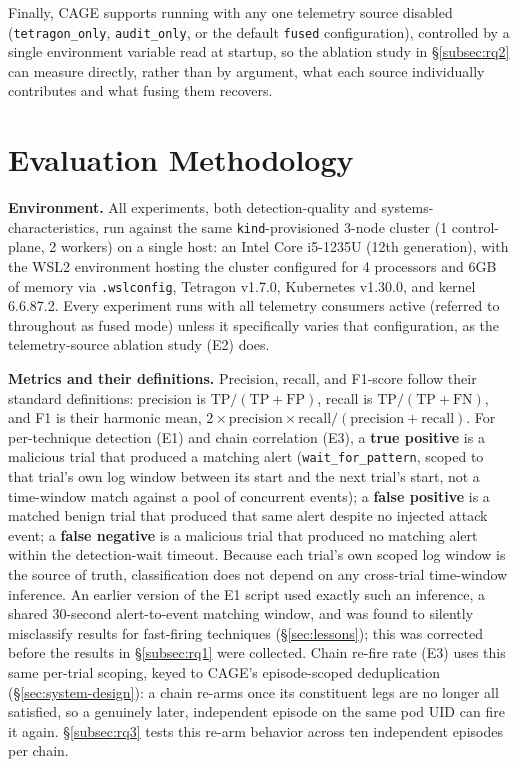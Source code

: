 \documentclass{ieeeaccess}
\begin{document}
Finally, CAGE supports running with any one telemetry source disabled
(\texttt{tetragon\_only}, \texttt{audit\_only}, or the default \texttt{fused} configuration),
controlled by a single environment variable read at startup, so the
ablation study in \S\ref{subsec:rq2} can measure directly, rather than by
argument, what each source individually contributes and what fusing
them recovers.

\section{Evaluation Methodology}
\label{sec:eval-methodology}

\textbf{Environment.} All experiments, both detection-quality and
systems-characteristics, run against the same \texttt{kind}-provisioned 3-node
cluster (1 control-plane, 2 workers) on a single host: an Intel Core
i5-1235U (12th generation), with the WSL2 environment hosting the
cluster configured for 4 processors and 6GB of memory via
\texttt{.wslconfig}, Tetragon v1.7.0, Kubernetes v1.30.0, and kernel 6.6.87.2.
Every
experiment runs with all telemetry consumers active (referred to
throughout as fused mode) unless it specifically varies that
configuration, as the telemetry-source ablation study (E2) does.

\textbf{Metrics and their definitions.} Precision, recall, and F1-score
follow their standard definitions: precision is $\mathrm{TP}/(\mathrm{TP}+\mathrm{FP})$, recall
is $\mathrm{TP}/(\mathrm{TP}+\mathrm{FN})$, and F1 is their harmonic mean, $2 \times \mathrm{precision} \times
\mathrm{recall} / (\mathrm{precision} + \mathrm{recall})$. For per-technique detection (E1) and
chain correlation (E3), a \textbf{true positive} is a malicious trial that
produced a matching alert (\texttt{wait\_for\_pattern}, scoped to that trial's
own log window between its start and the next trial's start, not a
time-window match against a pool of concurrent events); a \textbf{false
positive} is a matched benign trial that produced that same alert
despite no injected attack event; a \textbf{false negative} is a malicious
trial that produced no matching alert within the detection-wait
timeout. Because each trial's own scoped log window is the source of
truth, classification does not depend on any cross-trial time-window
inference. An earlier version of the E1 script used exactly such an
inference, a shared 30-second alert-to-event matching window, and was
found to silently misclassify results for fast-firing techniques
(\S\ref{sec:lessons}); this was corrected before the results in \S\ref{subsec:rq1} were collected.
Chain re-fire rate (E3) uses this same per-trial scoping, keyed to
CAGE's episode-scoped deduplication (\S\ref{sec:system-design}): a chain re-arms once its
constituent legs are no longer all satisfied, so a genuinely later,
independent episode on the same pod UID can fire it again. \S\ref{subsec:rq3} tests
this re-arm behavior across ten independent episodes per chain.
\end{document}
